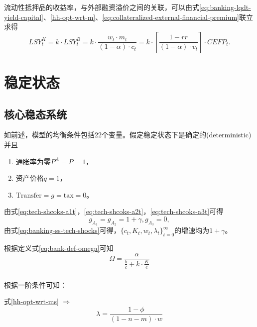 流动性抵押品的收益率，与外部融资溢价之间的关联，可以由式\eqref{eq:banking-lqdt-yield-capital}、\eqref{hh-opt-wrt-m}、\eqref{eq:collateralized-external-financial-premium}联立求得
\begin{equation}
  \label{eq:banking-efp-lsy-connection}
  LSY_t^K = k \cdot LSY_t^B = k \cdot \frac{w_t \cdot m_t}{\left( 1 - \alpha \right) \cdot c_t} = k \cdot \left[ \frac{1-rr}{\left( 1 - \alpha \right) \cdot v_t} \right] \cdot CEFP_t.
\end{equation}

\section{稳定状态}
\subsection{核心稳态系统}
如前述，模型的均衡条件包括22个变量。假定稳定状态下是确定的(deterministic)并且
\begin{enumerate}
  \item 通胀率为零$P^A = P = 1$，
  \item 资产价格$q = 1$，
  \item $\text{Transfer} = g = \text{tax}= 0$。
\end{enumerate}

由式\eqref{eq:tech-shcoks-a1t}，\eqref{eq:tech-shcoks-a2t}，\eqref{eq:tech-shcoks-a3t}可得
\begin{equation}
  \label{eq:banking-ss-tech-shocks}
  g_{A_1} = g_{A_2} = 1+ \gamma, g_{A_3} = 0,
\end{equation}
由式\eqref{eq:banking-ss-tech-shocks}可得，$\{ c_t,K_t,w_t,\lambda_t \}_{t=0}^{\infty}$的增速均为$1+\gamma$。

根据定义式\eqref{eq:bank-def-omega}可知
\begin{equation}
  \label{eq:banking-ss-bank-def-omega}
  \Omega = \frac{\alpha}{\frac{b}{c}+k \cdot \frac{K}{c}}
\end{equation}

\subsubsection{}
根据一阶条件可知：

式\eqref{hh-opt-wrt-ms} $\Rightarrow$
\begin{equation}
  \label{banking-ss-hh-opt-wrt-ms}
  \lambda = \frac{1-\phi}{\left(1-n-m\right) \cdot w}
\end{equation}

